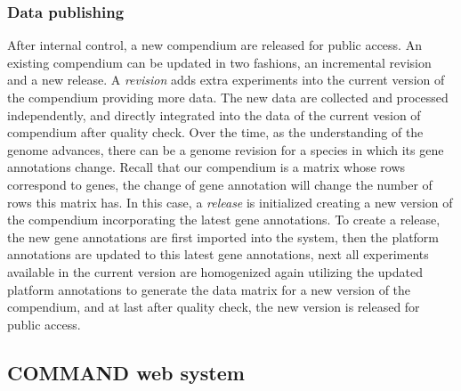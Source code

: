 \subsubsection{Data publishing}
%
After internal control, a new compendium are released for public access.
%
An existing compendium can be updated in two fashions, an incremental revision
and a new release.
%
A \textit{revision} adds extra experiments into the current version of the
compendium providing more data.
%
The new data are collected and processed independently, and directly
integrated into the data of the current vesion of compendium after quality
check.
%
Over the time, as the understanding of the genome advances, there can be a
genome revision for a species in which its gene annotations change.
%
Recall that our compendium is a matrix whose rows correspond to genes, the
change of gene annotation will change the number of rows this matrix has.
%
In this case, a \textit{release} is initialized creating a new version of the
compendium incorporating the latest gene annotations.
%
To create a release, the new gene annotations are first imported into the
system, then the platform annotations are updated to this latest gene
annotations, next all experiments available in the current version are
homogenized again utilizing the updated platform annotations to generate the
data matrix for a new version of the compendium, and at last after quality
check, the new version is released for public access.





\subsection{COMMAND web system}





